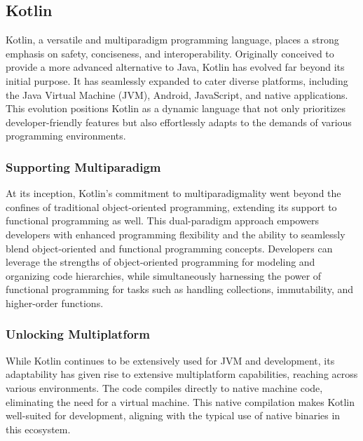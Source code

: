
\subsection{Kotlin}

Kotlin, a versatile and multiparadigm programming language, places a strong emphasis on safety, conciseness, and 
interoperability. Originally conceived to provide a more advanced alternative to Java, Kotlin has evolved far beyond 
its initial purpose. It has seamlessly expanded to cater diverse platforms, including the Java Virtual Machine (JVM), 
Android, JavaScript, and native applications. This evolution positions Kotlin as a dynamic language that not only 
prioritizes developer-friendly features but also effortlessly adapts to the demands of various programming environments.


\subsubsection{Supporting Multiparadigm}

At its inception, Kotlin's commitment to multiparadigmality went beyond the confines of traditional object-oriented 
programming, extending its support to functional programming as well. This dual-paradigm approach empowers developers 
with enhanced programming flexibility and the ability to seamlessly blend object-oriented and functional programming 
concepts. Developers can leverage the strengths of object-oriented programming for modeling and organizing code 
hierarchies, while simultaneously harnessing the power of functional programming for tasks such as handling collections, 
immutability, and higher-order functions.


\subsubsection{Unlocking Multiplatform}

While Kotlin continues to be extensively used for JVM and  development, its adaptability has given rise to 
extensive multiplatform capabilities, reaching across various environments. The code compiles directly to native machine 
code, eliminating the need for a virtual machine. This native compilation makes Kotlin well-suited for  
development, aligning with the typical use of native binaries in this ecosystem.

